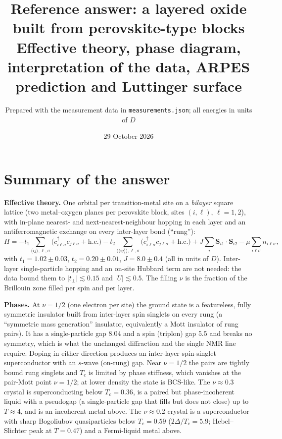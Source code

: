 \documentclass[11pt]{article}
\title{Reference answer: a layered oxide built from perovskite-type blocks\\[0.3em]
\large Effective theory, phase diagram, interpretation of the data, ARPES prediction and Luttinger surface}
\author{Prepared with the measurement data in \texttt{measurements.json}; all energies in units of $D$}
\date{29 October 2026}
\newcommand{\nuh}{\nu=1/2}
\newcommand{\nut}{\nu\approx0.3}
\newcommand{\nutw}{\nu\approx0.2}
\begin{document}
\maketitle

\section*{Summary of the answer}

\textbf{Effective theory.} One orbital per transition-metal site on a \emph{bilayer} square lattice (two metal--oxygen planes per perovskite block, sites $(i,\ell)$, $\ell=1,2$), with in-plane nearest- and next-nearest-neighbour hopping in each layer and an antiferromagnetic exchange on every inter-layer bond (``rung''):
\begin{equation}
H=-t_1\!\!\sum_{\langle ij\rangle,\ell,\sigma}\!\!\big(c^\dagger_{i\ell\sigma}c_{j\ell\sigma}+\text{h.c.}\big)
 -t_2\!\!\sum_{\langle\!\langle ij\rangle\!\rangle,\ell,\sigma}\!\!\big(c^\dagger_{i\ell\sigma}c_{j\ell\sigma}+\text{h.c.}\big)
 +J\sum_i \mathbf S_{i1}\!\cdot\!\mathbf S_{i2}-\mu\sum_{i\ell\sigma}n_{i\ell\sigma},
\label{eq:H}
\end{equation}
with $t_1=1.02\pm0.03$, $t_2=0.20\pm0.01$, $J=8.0\pm0.4$ (all in units of $D$). Inter-layer single-particle hopping and an on-site Hubbard term are not needed: the data bound them to $|t_\perp|\lesssim0.15$ and $|U|\lesssim0.5$. The filling $\nu$ is the fraction of the Brillouin zone filled per spin and per layer.

\textbf{Phases.} At $\nuh$ (one electron per site) the ground state is a featureless, fully symmetric insulator built from inter-layer spin singlets on every rung (a ``symmetric mass generation'' insulator, equivalently a Mott insulator of rung pairs). It has a single-particle gap $8.04$ and a spin (triplon) gap $5.5$ and breaks no symmetry, which is what the unchanged diffraction and the single NMR line require. Doping in either direction produces an inter-layer spin-singlet superconductor with an $s$-wave (on-rung) gap. Near $\nuh$ the pairs are tightly bound rung singlets and $T_c$ is limited by phase stiffness, which vanishes at the pair-Mott point $\nuh$; at lower density the state is BCS-like. The $\nut$ crystal is superconducting below $T_c=0.36$, is a paired but phase-incoherent liquid with a pseudogap (a single-particle gap that fills but does not close) up to $T\approx4$, and is an incoherent metal above. The $\nutw$ crystal is a superconductor with sharp Bogoliubov quasiparticles below $T_c=0.59$ ($2\Delta/T_c=5.9$; Hebel--Slichter peak at $T=0.47$) and a Fermi-liquid metal above.
\end{document}
